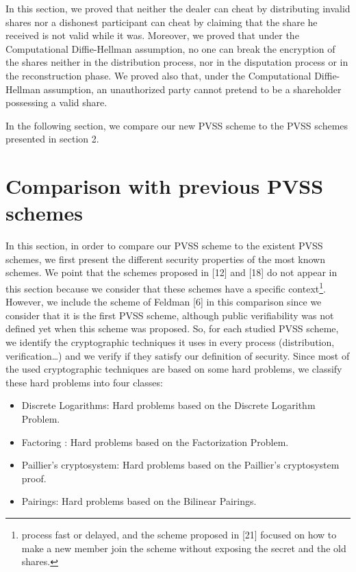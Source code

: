 \documentclass[submission,copyright,creativecommons]{eptcs}
\begin{document}
In this section, we proved that neither the dealer can cheat by distributing
invalid shares nor a dishonest participant can cheat by claiming that the
share he received is not valid while it was. Moreover, we proved that under
the Computational Diffie-Hellman assumption, no one can break the encryption
of the shares neither in the distribution process, nor in the disputation
process or in the reconstruction phase. We proved also that, under the
Computational Diffie-Hellman assumption, an unauthorized party cannot
pretend to be a shareholder possessing a valid share.

In the following section, we compare our new PVSS scheme to the PVSS schemes
presented in section 2.

\section{Comparison with previous PVSS schemes}

In this section, in order to compare our PVSS scheme to the existent PVSS
schemes, we first present the different security properties of the most
known schemes. We point that the schemes proposed in [12] and [18] do not
appear in this section because we consider that these schemes have a
specific context\footnote{process fast or delayed, and the scheme proposed in [21] focused on how to
make a new member join the scheme without exposing the secret and the old
shares.}. However, we include the scheme of Feldman [6] in this comparison
since we consider that it is the first PVSS scheme, although public
verifiability was not defined yet when this scheme was proposed. So, for each studied PVSS scheme, we identify the cryptographic techniques it uses in every process (distribution, verification\ldots ) and we verify
if they satisfy our definition of security. Since most of the used
cryptographic techniques are based on some hard problems, we classify these
hard problems into four classes:

\begin{itemize}
\item Discrete Logarithms: Hard problems based on the Discrete Logarithm
Problem.
\item Factoring : Hard problems based on the Factorization Problem.
\item Paillier's cryptosystem: Hard problems based on the Paillier's
cryptosystem proof.
\item Pairings: Hard problems based on the Bilinear Pairings.
\end{itemize}
\end{document}
